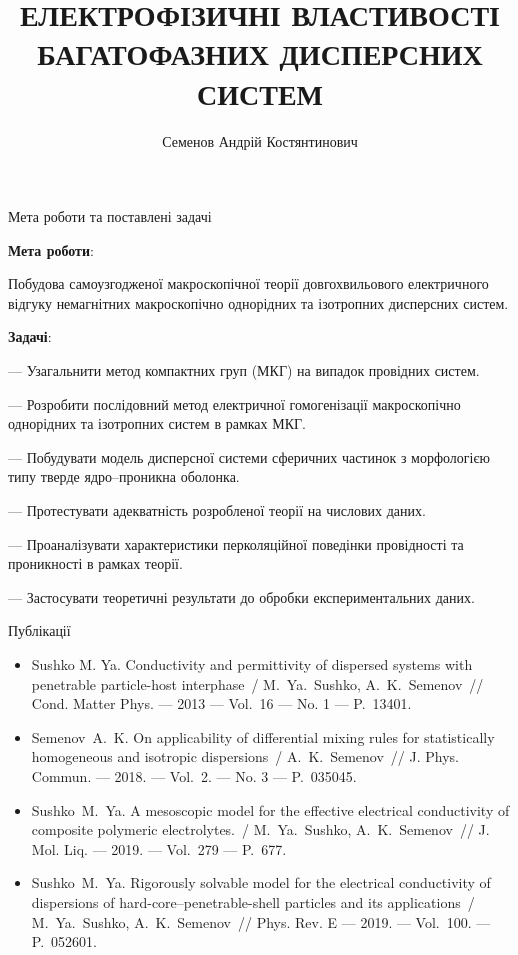 \documentclass[10pt]{beamer}
\title{ЕЛЕКТРОФІЗИЧНІ ВЛАСТИВОСТІ\\ БАГАТОФАЗНИХ ДИСПЕРСНИХ СИСТЕМ}
\date{}
\author{Семенов Андрій Костянтинович}
\institute{Науковий керівник: к.ф.-м.н., доц. М. Я. Сушко\\
Кафедра теоретичної фізики та астрономії\\
Одеський національний університет імені І.І. Мечникова}
\begin{document}
\maketitle

\begin{frame}{Мета роботи та поставлені задачі}

{\bf Мета роботи}:

{\footnotesize 
Побудова самоузгодженої макроскопічної теорії довгохвильового електричного відгуку немагнітних макроскопічно однорідних та ізотропних дисперсних систем.
}

{\bf Задачі}:

{\footnotesize 
--- Узагальнити метод компактних груп (МКГ) на випадок провідних систем.

--- Розробити послідовний метод електричної гомогенізації макроскопічно однорідних та ізотропних систем в рамках МКГ.

--- Побудувати модель дисперсної системи сферичних частинок з морфологією типу тверде ядро--проникна оболонка.

--- Протестувати адекватність розробленої теорії на числових даних.

--- Проаналізувати характеристики перколяційної поведінки провідності та проникності в рамках теорії.

--- Застосувати теоретичні результати до обробки експериментальних даних.

}

\end{frame}

\begin{frame}{Публікації}

  \begin{itemize}
    \item
    Sushko M. Ya. Conductivity and permittivity of dispersed systems 
    with penetrable particle-host interphase~/ M.~Ya.~Sushko, 
    A.~K.~Semenov~// Cond. Matter Phys. --- 2013 --- Vol.~16 --- No. 1 
    --- P.~13401.
    
    \item
    Semenov~A.~K. On applicability of differential mixing rules for
      statistically homogeneous and isotropic dispersions~/ A.~K.~Semenov~//
      J. Phys. Commun. --- 2018. --- Vol.~2. --- No. 3 --- P.~035045.
    
    \item
    Sushko~M.~Ya. A mesoscopic model for the effective electrical 
    conductivity of composite polymeric electrolytes.~/ M.~Ya.~Sushko,
    A.~K.~Semenov~// J. Mol. Liq. --- 2019. --- Vol.~279 --- P.~677.
    
    \item
    Sushko~M.~Ya. Rigorously solvable model for the electrical conductivity of dispersions of hard-core--penetrable-shell particles and its applications~/
    M.~Ya.~Su\-shko, A.~K.~Semenov~//
    Phys. Rev. E --- 2019. --- Vol.~100. --- P.~052601.
  \end{itemize}

\end{frame}
\end{document}

